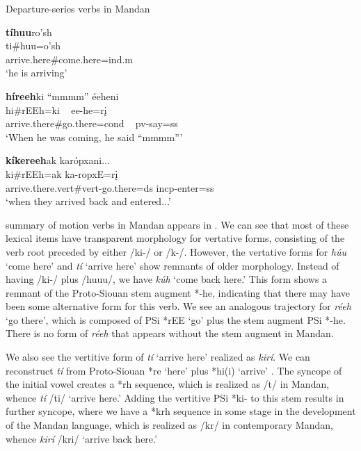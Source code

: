\begin{exe}
\item\label{departureverbsmandan} Departure-series verbs in Mandan

	\begin{xlist}
	
	\item \glll \textbf{tíhuu}ro'sh\\
	ti\#huu=o'sh\\
	\textnormal{arrive.here}\#\textnormal{come.here}=ind.m\\
	\glt `he is arriving' \citep[37]{kennard1936}
	
	\item \glll \textbf{híreeh}ki ``mmmm'' éeheni\\
	hi\#rEEh=ki ~ ee-he=rį\\
	\textnormal{arrive.there}\#\textnormal{go.there}=cond ~ pv-\textnormal{say}=ss\\
	\glt `When he was coming, he said ``mmmm''' \citep[73]{hollow1973b}

        \item \glll \textbf{kíkereeh}ak karópxani...\\
        ki\#rEEh=ak ka-ropxE=rį\\
        \textnormal{arrive.there}.vert\#vert-\textnormal{go.there}=ds incp-\textnormal{enter}=ss\\
        \glt `when they arrived back and entered...' \citep[72]{trechter2012b}
        
	
	\end{xlist}

\end{exe}

 summary of motion verbs in Mandan appears in . We can see that most of these lexical items have transparent morphology for vertative forms, consisting of the verb root preceded by either /ki-/ or /k-/. However, the vertative forms for \textit{húu} `come here' and \textit{tí} `arrive here' show remnants of older morphology. Instead of having /ki-/ plus /huuu/, we have \textit{kúh} `come back here.' This form shows a remnant of the Proto-Siouan stem augment *-he, indicating that there may have been some alternative form for this verb. We see an analogous trajectory for \textit{réeh} `go there', which is composed of PSi *rEE `go' plus the stem augment PSi *-he. There is no form of \textit{réeh} that appears without the stem augment in Mandan.

We also see the vertitive form of \textit{tí} `arrive here' realized as \textit{kirí}. We can reconstruct \textit{tí} from Proto-Siouan *re `here' plus *hi(i) `arrive' \citep{kasak2013b,rankin2015}. The syncope of the initial vowel creates a *rh sequence, which is realized as /t/ in Mandan, whence \textit{tí} /ti/ `arrive here.' Adding the vertitive PSi *ki- to this stem results in further syncope, where we have a *krh sequence in some stage in the development of the Mandan language, which is realized as /kr/ in contemporary Mandan, whence \textit{kirí} /kri/ `arrive back here.'

